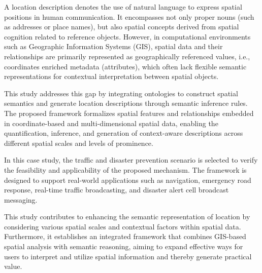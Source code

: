 \begin{abstract*}

A location description denotes the use of natural language to express spatial positions in human communication. It encompasses not only proper nouns (such as addresses or place names), but also spatial concepts derived from spatial cognition related to reference objects. However, in computational environments such as Geographic Information Systems (GIS), spatial data and their relationships are primarily represented as geographically referenced values, i.e., coordinates enriched metadata (attributes), which often lack flexible semantic representations for contextual interpretation between spatial objects. 

This study addresses this gap by integrating ontologies to construct spatial semantics and generate location descriptions through semantic inference rules. The proposed framework formalizes spatial features and relationships embedded in coordinate-based and multi-dimensional spatial data, enabling the quantification, inference, and generation of context-aware descriptions across different spatial scales and levels of prominence.

In this case study, the traffic and disaster prevention scenario is selected to verify the feasibility and applicability of the proposed mechanism. The framework is designed to support real-world applications such as navigation, emergency road response, real-time traffic broadcasting, and disaster alert cell broadcast messaging.

This study contributes to enhancing the semantic representation of location by considering various spatial scales and contextual factors within spatial data. Furthermore, it establishes an integrated framework that combines GIS-based spatial analysis with semantic reasoning, aiming to expand effective ways for users to interpret and utilize spatial information and thereby generate practical value.


\end{abstract*}